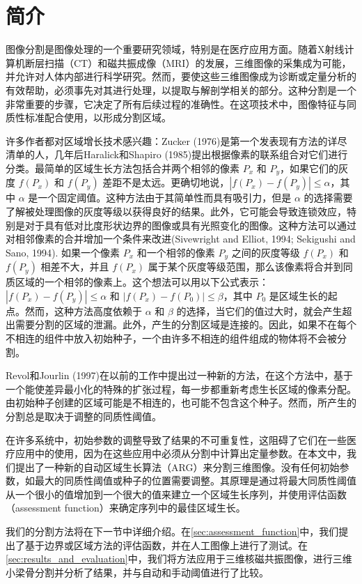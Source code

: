 \section{简介}\label{sec:introduction}

图像分割是图像处理的一个重要研究领域，特别是在医疗应用方面。随着X射线计算机断层扫描（CT）和磁共振成像（MRI）的发展，三维图像的采集成为可能，并允许对人体内部进行科学研究。然而，要使这些三维图像成为诊断或定量分析的有效帮助，必须事先对其进行处理，以提取与解剖学相关的部分。这种分割是一个非常重要的步骤，它决定了所有后续过程的准确性。在这项技术中，图像特征与同质性标准配合使用，以形成分割区域。

许多作者都对区域增长技术感兴趣：Zucker (1976)\cite{zucker1976region}是第一个发表现有方法的详尽清单的人，几年后Haralick和Shapiro (1985)\cite{haralick1985survey}提出根据像素的联系组合对它们进行分类。最简单的区域生长方法包括合并两个相邻的像素 $P_x$ 和 $P_y$，如果它们的灰度 $f(P_x)$ 和 $f(P_y)$ 差距不是太远。更确切地说，$|f(P_x)-f(P_y)| \leq \alpha$，其中 $\alpha$ 是一个固定阈值。这种方法由于其简单性而具有吸引力，但是 $\alpha$ 的选择需要了解被处理图像的灰度等级以获得良好的结果。此外，它可能会导致连锁效应，特别是对于具有低对比度形状边界的图像或具有光照变化的图像。这种方法可以通过对相邻像素的合并增加一个条件来改进(Sivewright and Elliot, 1994\cite{sivewright1994interactive}; Sekigushi and Sano, 1994\cite{sekigushi1994interactive}). 如果一个像素 $P_x$ 和一个相邻的像素 $P_y$ 之间的灰度等级 $f(P_x)$ 和 $f(P_y)$ 相差不大，并且 $f(P_x)$ 属于某个灰度等级范围，那么该像素将合并到同质区域的一个相邻的像素上。这个想法可以用以下公式表示：$|f(P_x)-f(P_y)| \leq \alpha$ 和 $|f(P_x)-f(P_0)| \leq \beta$，其中 $P_0$ 是区域生长的起点。然而，这种方法高度依赖于 $\alpha$ 和 $\beta$ 的选择，当它们的值过大时，就会产生超出需要分割的区域的泄漏。此外，产生的分割区域是连接的。因此，如果不在每个不相连的组件中放入初始种子，一个由许多不相连的组件组成的物体将不会被分割。

Revol和Jourlin (1997)在\cite{revol1997new}以前的工作中提出过一种新的方法，在这个方法中，基于一个能使差异最小化的特殊的扩张过程，每一步都重新考虑生长区域的像素分配。由初始种子创建的区域可能是不相连的，也可能不包含这个种子。然而，所产生的分割总是取决于调整的同质性阈值。

在许多系统中，初始参数的调整导致了结果的不可重复性，这阻碍了它们在一些医疗应用中的使用，因为在这些应用中必须从分割中计算出定量参数。在本文中，我们提出了一种新的自动区域生长算法（ARG）来分割三维图像。没有任何初始参数，如最大的同质性阈值或种子的位置需要调整。其原理是通过将最大同质性阈值从一个很小的值增加到一个很大的值来建立一个区域生长序列，并使用评估函数（assessment function）来确定序列中的最佳区域生长。

我们的分割方法将在下一节中详细介绍。在\cref{sec:assessment_function}中，我们提出了基于边界或区域方法的评估函数，并在人工图像上进行了测试。在\cref{sec:results_and_evaluation}中，我们将方法应用于三维核磁共振图像，进行三维小梁骨分割并分析了结果，并与自动和手动阈值进行了比较。
